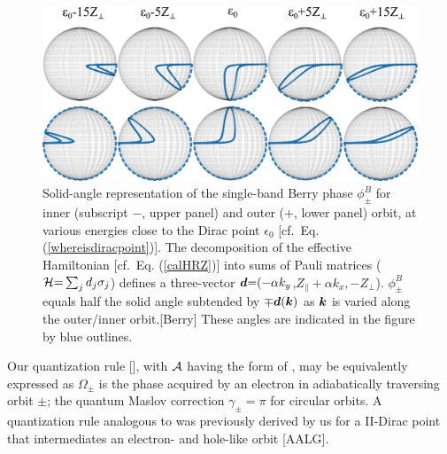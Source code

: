 \documentclass[aps, prb, showpacs, twocolumn, notitlepage, superscriptaddress]{revtex4-1}
\begin{document}
\begin{figure}
\includegraphics[width=1.0\columnwidth]{blochsphere.png}
\caption{Solid-angle representation of  the single-band Berry phase $\phi_{\pm}^B$ for inner (subscript $-$, upper panel) and outer ($+$, lower panel) orbit, at various energies close to the Dirac point $\epsilon_0$ [cf.\ Eq. (\ref{whereisdiracpoint})]. The decomposition of the effective Hamiltonian [cf.\ Eq. (\ref{calHRZ})] into sums of Pauli matrices (${\cal H}{=}\sum_jd_j\sigma_j$) defines a three-vector $\boldsymbol{d}{=}({-}\alpha k_y$,$Z_\parallel{+}\alpha k_x,{-}Z_\perp$).
 $\phi_{\pm}^B$  equals half the solid angle subtended by   ${\mp} \boldsymbol{d}(\boldsymbol{k})$ as $\boldsymbol{k}$ is varied along the outer/inner orbit.[Berry]   These angles are indicated in the figure by blue outlines.\label{fig:blochsphere}}
\end{figure}

Our quantization rule [], with ${\cal A}$ having the form of , may be equivalently expressed as
$\Omega_{\pm}$ is the phase acquired by an electron in adiabatically traversing orbit $\pm$; the quantum Maslov correction $\gamma_{\pm}{=}\pi$ for circular orbits.  A quantization rule analogous to  was previously derived by us for a II-Dirac point that intermediates an electron- and hole-like orbit [AALG]. 

\end{document}
